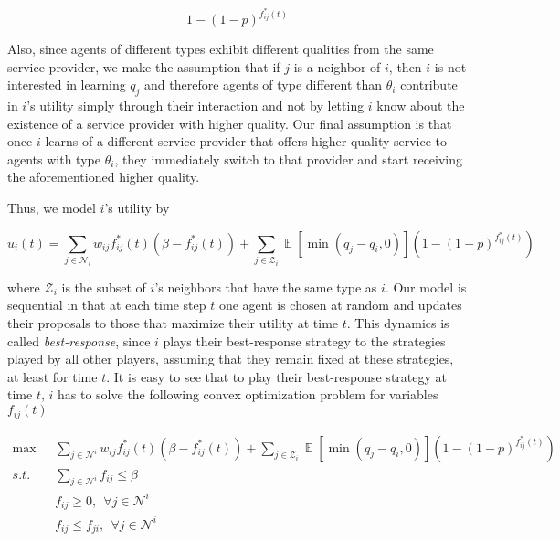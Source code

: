 \documentclass[A4paper,11pt]{article}
\newcommand{\Ex}{\mathop{\mathbb{E}}}
\begin{document}
\[
1 - {\left( 1 - p \right)}^{f^*_{ij}(t)}
\]

\par Also, since agents of different types exhibit different qualities from the same service provider, we make the assumption
that if $j$ is a neighbor of $i$, then $i$ is not interested in learning $q_j$ and therefore agents of type different than
$\theta_i$ contribute in $i$'s utility simply through their interaction and not by letting $i$ know about the existence of a
service provider with higher quality. Our final assumption is that once $i$ learns of a different service provider that offers
higher quality service to agents with type $\theta_i$, they immediately switch to that provider and start receiving the
aforementioned higher quality.

\par Thus, we model $i$'s utility by

\begin{equation}\label{eq:util}
u_i(t) = \sum_{j \in \mathcal{N}_i} {w_{ij} f^*_{ij}(t) \left( \beta - f^*_{ij}(t) \right) } +
\sum_{j \in \mathcal{Z}_i} {\Ex \left[ \min \left( q_j - q_i, 0 \right) \right] \left( 1 - {\left( 1 - p \right)}^{f^*_{ij}(t)} \right) }
\end{equation}

where $\mathcal{Z}_i$ is the subset of $i$'s neighbors that have the same type as $i$. Our model is sequential in that at each
time step $t$ one agent is chosen at random and updates their proposals to those that maximize their utility at time $t$.
This dynamics is called \textit{best-response}, since $i$ plays their best-response strategy to the strategies played by all
other players, assuming that they remain fixed at these strategies, at least for time $t$. It is easy to see that to play their
best-response strategy at time $t$, $i$ has to solve the following convex optimization problem for variables $f_{ij}(t)$

\begin{align}\label{eq:opt-prog}
\max & \: \: \: \sum_{j \in \mathcal{N}^i} {w_{ij} f^*_{ij}(t) \left( \beta - f^*_{ij}(t) \right) } +
\sum_{j \in \mathcal{Z}_i} {\Ex \left[ \min \left( q_j - q_i, 0 \right) \right] \left( 1 - {\left( 1 - p \right)}^{f^*_{ij}(t)} \right) } \\
s.t. & \: \: \: \sum_{j \in \mathcal{N}^i} {f_{ij}} \leq \beta \nonumber \\
& \: \: \: f_{ij} \geq 0, \: \: \forall j \in \mathcal{N}^i \nonumber \\
& \: \: \: f_{ij} \leq f_{ji}, \: \: \forall j \in \mathcal{N}^i \nonumber
\end{align}
\end{document}

